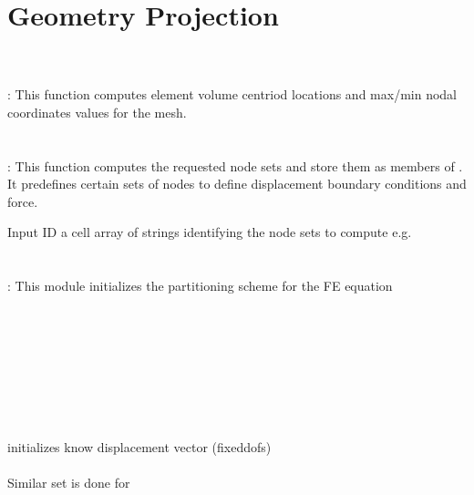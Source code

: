 \section{Geometry Projection}
 \\
\tikzcircle{2pt}\indent{} \\
\tikzcircle{2pt}\indent{} :  This function computes element volume centriod locations and max/min nodal coordinates values for the mesh. \\
\indent\indent{}\\
\tikzcircle{2pt}\indent{}\\
\indent\indent{} : This function computes the requested node sets and store them as members of . It predefines certain sets of nodes to define displacement boundary conditions and force. 

Input ID a cell array of strings identifying the node sets to compute e.g. \\
\indent\indent{} \\
\indent\indent{} \\
\tikzcircle{2pt}\indent{} : This module initializes the partitioning scheme for the FE equation\\
\indent\indent{}\\
\indent\indent\indent {}\\
\indent\indent\indent {}\\
\indent\indent\indent {}\\
\indent\indent\indent {}\\
\indent\indent\indent {}\\
\indent\indent\indent {}\\
\indent\indent\indent {}\\
\indent\indent\indent initializes know displacement vector (fixeddofs) \\
\indent\indent\indent {}\\
Similar set is done for 

